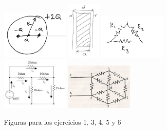 \documentclass{article}
\begin{document}
\begin{figure}
\centering
\begin{center}
  \includegraphics[width=0.30\textwidth]{sphere.png}
  \includegraphics[width=0.15\textwidth]{capacitor.png}
  \includegraphics[width=0.30\textwidth]{triangulo.png}
  \includegraphics[width=0.30\textwidth]{circuito.jpg}
  \includegraphics[width=0.30\textwidth]{resistance.jpg}
\end{center}
\caption{Figuras para los ejercicios 1, 3, 4, 5 y 6}
\end{figure} 
\end{document}
